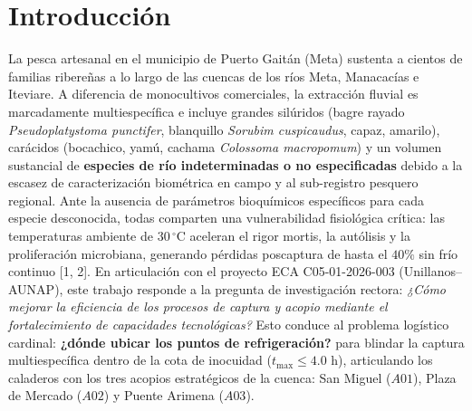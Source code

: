\documentclass[10pt,twocolumn,a4paper]{article}
\begin{document}
\section{Introducción}
La pesca artesanal en el municipio de Puerto Gaitán (Meta) sustenta a cientos de familias ribereñas a lo largo de las cuencas de los ríos Meta, Manacacías e Iteviare. A diferencia de monocultivos comerciales, la extracción fluvial es marcadamente multiespecífica e incluye grandes silúridos (bagre rayado \textit{Pseudoplatystoma punctifer}, blanquillo \textit{Sorubim cuspicaudus}, capaz, amarilo), carácidos (bocachico, yamú, cachama \textit{Colossoma macropomum}) y un volumen sustancial de \textbf{especies de río indeterminadas o no especificadas} debido a la escasez de caracterización biométrica en campo y al sub-registro pesquero regional. Ante la ausencia de parámetros bioquímicos específicos para cada especie desconocida, todas comparten una vulnerabilidad fisiológica crítica: las temperaturas ambiente de $30\,^\circ\text{C}$ aceleran el rigor mortis, la autólisis y la proliferación microbiana, generando pérdidas poscaptura de hasta el $40\%$ sin frío continuo [1, 2]. En articulación con el proyecto ECA C05-01-2026-003 (Unillanos--AUNAP), este trabajo responde a la pregunta de investigación rectora: \textit{¿Cómo mejorar la eficiencia de los procesos de captura y acopio mediante el fortalecimiento de capacidades tecnológicas?} Esto conduce al problema logístico cardinal: \textbf{¿dónde ubicar los puntos de refrigeración?} para blindar la captura multiespecífica dentro de la cota de inocuidad ($t_{\max} \le 4.0\text{ h}$), articulando los caladeros con los tres acopios estratégicos de la cuenca: San Miguel ($A01$), Plaza de Mercado ($A02$) y Puente Arimena ($A03$).
\end{document}
